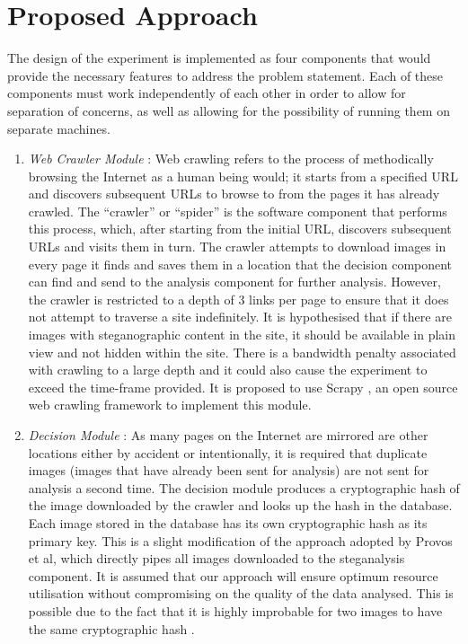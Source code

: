 \documentclass[12pt]{extreport}
\begin{document}
\chapter{Proposed Approach}
\label{ch:papproach}
The design of the experiment is implemented as four components that would provide the necessary features to address the problem statement. Each of these components must work independently of each other in order to allow for separation of concerns, as well as allowing for the possibility of running them on separate machines. 
\begin{enumerate}
\item \emph{Web Crawler Module} :
Web crawling refers to the process of methodically browsing the Internet as a human being would; it starts from a specified URL and discovers subsequent URLs to browse to from the pages it has already crawled. The ``crawler'' or ``spider'' is the software component that performs this process, which, after starting from the initial URL, discovers subsequent URLs and visits them in turn. 
The crawler attempts to download images in every page it finds and saves them in a location that the decision component can find and send to the analysis component for further analysis.  However, the crawler is restricted to a depth of 3 links per page to ensure that it does not attempt to traverse a site indefinitely. It is hypothesised that if there are images with steganographic content in the site, it should be available in plain view and not hidden within the site. There is a bandwidth penalty associated with crawling to a large depth and it could also cause the experiment to exceed the time-frame provided.  It is proposed to use Scrapy \cite{scrapy}, an open source web crawling framework to implement this module.
 
\item \emph{Decision Module} : 
As many pages on the Internet are mirrored are other locations either by accident or intentionally, it is required that duplicate images (images that have already been sent for analysis) are not sent for analysis a second time. The decision module produces a cryptographic hash of the image downloaded by the crawler and looks up the hash in the database. Each image stored in the database has its own cryptographic hash as its primary key. This is a slight modification of the approach adopted by Provos et al, which directly pipes all images downloaded to the steganalysis component. It is assumed that our approach will ensure optimum resource utilisation without compromising on the quality of the data analysed. This is possible due to the fact that it is highly improbable for two images to have the same cryptographic hash  \cite{wang2005collision}.


\end{enumerate}
\end{document}
